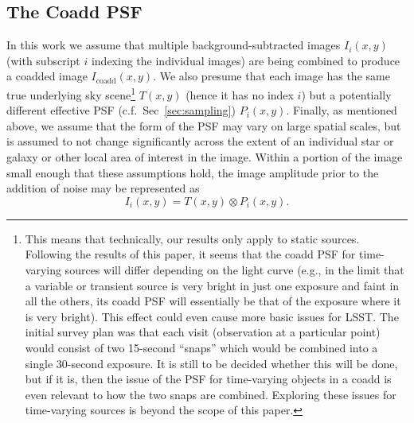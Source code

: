 \documentclass{aastex63}
\newcommand{\irresponse}[1]{{#1}}
\begin{document}
\irresponse{\subsection{The Coadd PSF}}
In this work we assume that multiple background-subtracted images $I_i(x,y)$ (with subscript $i$ indexing the individual images) are being combined to produce a coadded image $I_\text{coadd}(x,y)$.   We also presume that each image has the same true underlying sky scene\footnote{This means that technically, our results only apply to static sources.  Following the results of this paper, it seems that the coadd PSF for time-varying sources will differ depending on the light curve (e.g., in the limit that a variable or transient source is very bright in just one exposure and faint in all the others, its coadd PSF will essentially be that of the exposure where it is very bright). \irresponse{This effect could even cause more basic issues for LSST.  The initial survey plan was that each visit (observation at a particular point) would consist of two 15-second ``snaps'' which would be combined into a single 30-second exposure. It is still to be decided whether this will be done, but if it is, then the issue of the PSF for time-varying objects in a coadd is} even relevant to how the two snaps are combined. Exploring these issues for time-varying sources is beyond the scope of this paper.} $T(x,y)$ (hence it has no index $i$) but a potentially different effective PSF (c.f.\ Sec~\ref{sec:sampling})
$P_i(x,y)$.  Finally, as mentioned above, we assume that the form of the PSF may vary on large spatial scales, but is assumed to not change \irresponse{significantly} across the extent of an individual star or galaxy or other local area of interest in the image.  Within a portion of the image small enough that these assumptions hold, the image amplitude prior to the addition of noise may be represented as
\begin{equation}
I_i(x,y) = T(x,y) \otimes P_i(x,y).
\end{equation}
\end{document}

